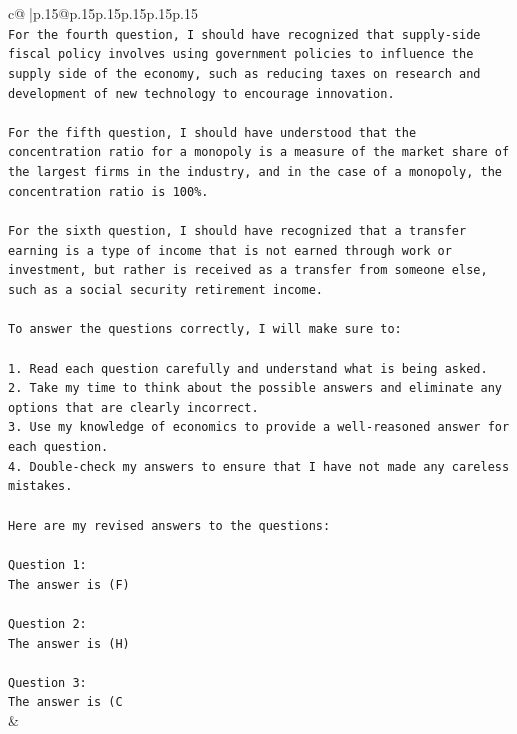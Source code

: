 \documentclass{article}
\begin{document}
{\begin{supertabular}{c@{$\;$}|p{.15\linewidth}@{}p{.15\linewidth}p{.15\linewidth}p{.15\linewidth}p{.15\linewidth}p{.15\linewidth}}
{{{\\ 
\texttt{For the fourth question, I should have recognized that supply{-}side fiscal policy involves using government policies to influence the supply side of the economy, such as reducing taxes on research and development of new technology to encourage innovation.} \\
\\ 
\texttt{For the fifth question, I should have understood that the concentration ratio for a monopoly is a measure of the market share of the largest firms in the industry, and in the case of a monopoly, the concentration ratio is 100\%.} \\
\\ 
\texttt{For the sixth question, I should have recognized that a transfer earning is a type of income that is not earned through work or investment, but rather is received as a transfer from someone else, such as a social security retirement income.} \\
\\ 
\texttt{To answer the questions correctly, I will make sure to:} \\
\\ 
\texttt{1. Read each question carefully and understand what is being asked.} \\
\texttt{2. Take my time to think about the possible answers and eliminate any options that are clearly incorrect.} \\
\texttt{3. Use my knowledge of economics to provide a well{-}reasoned answer for each question.} \\
\texttt{4. Double{-}check my answers to ensure that I have not made any careless mistakes.} \\
\\ 
\texttt{Here are my revised answers to the questions:} \\
\\ 
\texttt{Question 1:} \\
\texttt{The answer is (F)} \\
\\ 
\texttt{Question 2:} \\
\texttt{The answer is (H)} \\
\\ 
\texttt{Question 3:} \\
\texttt{The answer is (C} \\
            }
        }
    }
    & \\ \\

\end{supertabular}
}
\end{document}
